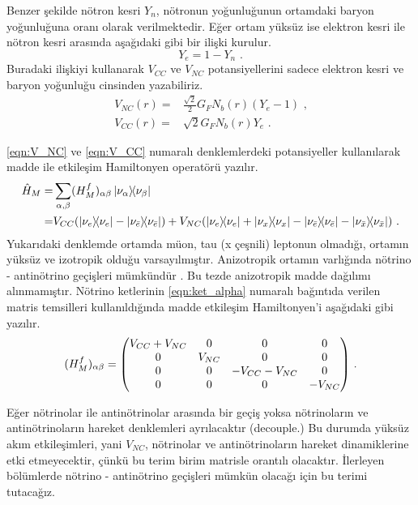 Benzer şekilde nötron kesri $ Y_{n} $, nötronun yoğunluğunun ortamdaki baryon yoğunluğuna oranı olarak verilmektedir. Eğer ortam yüksüz ise elektron kesri ile nötron kesri arasında aşağıdaki gibi bir ilişki kurulur.
\begin{equation}
	Y_{e} = 1-Y_{n} \text{ .}
\end{equation}
Buradaki ilişkiyi kullanarak $ V_{CC} $ ve $V_{NC}$ potansiyellerini sadece elektron kesri ve baryon yoğunluğu cinsinden yazabiliriz.
\begin{align}
	\label{eqn:V_NC}V_{NC}(r) =& \frac{\sqrt{2}}{2} G_{F} N_{b}(r)(Y_{e}-1) \text{ ,}\\
	\label{eqn:V_CC}V_{CC}(r) =& \sqrt{2} G_{F} N_{b}(r)Y_{e} \text{ .}
\end{align}

\eqref{eqn:V_NC} ve \eqref{eqn:V_CC} numaralı denklemlerdeki potansiyeller kullanılarak madde ile etkileşim Hamiltonyen operatörü yazılır.
\begin{align}\label{eqn:Hmat_op}
    \nonumber \hat{H}_{M} =& \sum_{\alpha,\beta} (H^{f}_{M})_{\alpha\beta} \dyad{\nu_{\alpha}}{\nu_{\beta}}\\
	=& V_{CC}(\dyad{\nu_{e}}{\nu_{e}}-\dyad{\nu_{\bar{e}}}{\nu_{\bar{e}}})+
	V_{NC}(\dyad{\nu_{e}}{\nu_{e}}+\dyad{\nu_{x}}{\nu_{x}}-\dyad{\nu_{\bar{e}}}{\nu_{\bar{e}}}-\dyad{\nu_{\bar{x}}}{\nu_{\bar{x}}} ) \text{ .}
\end{align}
Yukarıdaki denklemde ortamda müon, tau (x çeşnili) leptonun olmadığı, ortamın yüksüz ve izotropik olduğu varsayılmıştır. Anizotropik ortamın varlığında nötrino - antinötrino geçişleri mümkündür \cite{Volpe:2013uxl,Tian:2016hec}. Bu tezde anizotropik madde dağılımı alınmamıştır. Nötrino ketlerinin \eqref{eqn:ket_alpha} numaralı bağıntıda verilen matris temsilleri kullanıldığında madde etkileşim Hamiltonyen'i aşağıdaki gibi yazılır.
\begin{equation}
	(H^{f}_{M})_{\alpha\beta} = \mqty(V_{CC}+V_{NC} & 0 & 0 & 0\\0 & V_{NC} & 0 & 0
	\\0 & 0 & -V_{CC}-V_{NC} & 0\\ 0 & 0 & 0 & -V_{NC} ) \text{ .}
\end{equation}

Eğer nötrinolar ile antinötrinolar arasında bir geçiş yoksa nötrinoların ve antinötrinoların hareket denklemleri ayrılacaktır (decouple.) Bu durumda yüksüz akım etkileşimleri, yani $ V_{NC} $, nötrinolar ve antinötrinoların hareket dinamiklerine etki etmeyecektir, çünkü bu terim birim matrisle orantılı olacaktır. İlerleyen bölümlerde nötrino - antinötrino geçişleri mümkün olacağı için bu terimi tutacağız.

